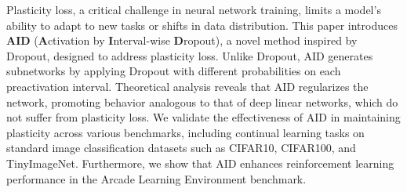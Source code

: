 

Plasticity loss, a critical challenge in neural network training, limits a model's ability to adapt to new tasks or shifts in data distribution. 
This paper introduces \textbf{AID} (\textbf{A}ctivation by \textbf{I}nterval-wise \textbf{D}ropout), a novel method inspired by Dropout, designed to address plasticity loss. Unlike Dropout, AID generates subnetworks by applying Dropout with different probabilities on each preactivation interval. Theoretical analysis reveals that AID regularizes the network, promoting behavior analogous to that of deep linear networks, which do not suffer from plasticity loss. We validate the effectiveness of AID in maintaining plasticity across various benchmarks, including continual learning tasks on standard image classification datasets such as CIFAR10, CIFAR100, and TinyImageNet. Furthermore, we show that AID enhances reinforcement learning performance in the Arcade Learning Environment benchmark.

